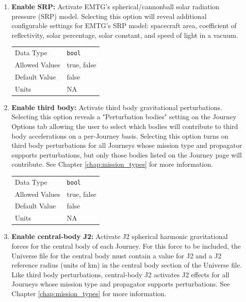     \begin{enumerate}

        \item \textbf{Enable \ac{SRP}:} Activate \ac{EMTG}'s spherical/cannonball solar radiation pressure (\ac{SRP}) model. Selecting this option will reveal additional configurable settings for \ac{EMTG}'s \ac{SRP} model: spacecraft area, coefficient of reflectivity, solar percentage, solar constant, and speed of light in a vacuum.
        
            \begin{table}[H]
                \hspace{2cm}
                \begin{tabular}{ll}
                Data Type & \verb|bool| \\
                Allowed Values & true, false \\
                Default Value & false \\
                Units & NA
                \end{tabular}
            \end{table}

        \item \textbf{Enable third body:} Activate third body gravitational perturbations. Selecting this option reveals a "Perturbation bodies" setting on the Journey Options tab allowing the user to select which bodies will contribute to third body accelerations on a per-Journey basis. Selecting this option turns on third body perturbations for all Journeys whose mission type and propagator supports perturbations, but only those bodies listed on the Journey page will contribute. See Chapter \ref{chap:mission_types} for more information.

            \begin{table}[H]
                \hspace{2cm}
                \begin{tabular}{ll}
                Data Type & \verb|bool| \\
                Allowed Values & true, false \\
                Default Value & false \\
                Units & NA
                \end{tabular}
            \end{table}

        \item \textbf{Enable central-body J2:} Activate J2 spherical harmonic gravitational forces for the central body of each Journey. For this force to be included, the Universe file for the central body must contain a value for J2 and a J2 reference radius (units of km) in the central body section of the Universe file. Like third body perturbations, central-body J2 activates J2 effects for all Journeys whose mission type and propagator supports perturbations. See Chapter \ref{chap:mission_types} for more information.


\end{enumerate}
